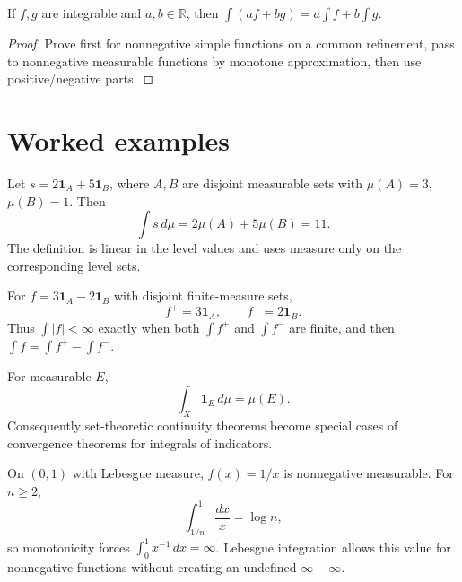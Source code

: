 \begin{theorem}[Linearity]\label{thm:iii03-03}
If $f,g$ are integrable and $a,b\in\mathbb R$, then $\int(af+bg)=a\int f+b\int g$.
\begin{proof}
Prove first for nonnegative simple functions on a common refinement, pass to nonnegative measurable functions by monotone approximation, then use positive/negative parts.
\end{proof}
\end{theorem}

\section{Worked examples}

\begin{example}\label{ex:iii03-worked-01}
Let \(s=2\mathbf1_A+5\mathbf1_B\), where \(A,B\) are disjoint measurable
sets with \(\mu(A)=3\), \(\mu(B)=1\). Then
\[
\int s\,d\mu=2\mu(A)+5\mu(B)=11.
\]
The definition is linear in the level values and uses measure only on the
corresponding level sets.
\end{example}

\begin{example}\label{ex:iii03-worked-02}
For \(f=3\mathbf1_A-2\mathbf1_B\) with disjoint finite-measure sets,
\[
f^+=3\mathbf1_A,\qquad f^-=2\mathbf1_B.
\]
Thus \(\int |f|<\infty\) exactly when both \(\int f^+\) and \(\int f^-\) are
finite, and then \(\int f=\int f^+-\int f^-\).
\end{example}

\begin{example}\label{ex:iii03-worked-03}
For measurable \(E\),
\[
\int_X\mathbf1_E\,d\mu=\mu(E).
\]
Consequently set-theoretic continuity theorems become special cases of
convergence theorems for integrals of indicators.
\end{example}

\begin{example}\label{ex:iii03-worked-04}
On \((0,1)\) with Lebesgue measure, \(f(x)=1/x\) is nonnegative measurable.
For \(n\ge2\),
\[
\int_{1/n}^1\frac{dx}{x}=\log n,
\]
so monotonicity forces \(\int_0^1x^{-1}\,dx=\infty\). Lebesgue integration
allows this value for nonnegative functions without creating an undefined
\(\infty-\infty\).
\end{example}


